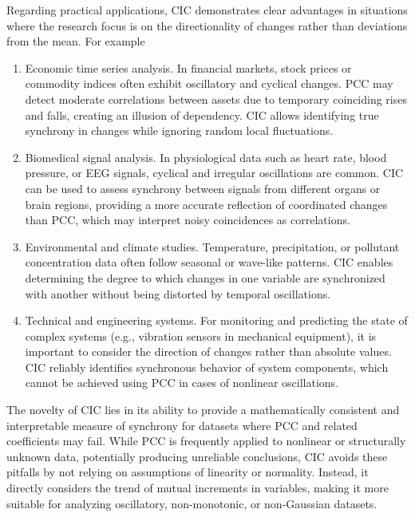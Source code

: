 \documentclass[aos]{imsart}
\newcommand{\cic}{\text{CIC}}
\newcommand{\pcc}{\text{PCC}}
\begin{document}
Regarding practical applications, $\cic$ demonstrates clear advantages in situations where the research focus is on the directionality of changes rather than deviations from the mean. For example
\begin{enumerate}
\item Economic time series analysis. In financial markets, stock prices or commodity indices often exhibit oscillatory and cyclical changes. $\pcc$ may detect moderate correlations between assets due to temporary coinciding rises and falls, creating an illusion of dependency. $\cic$ allows identifying true synchrony in changes while ignoring random local fluctuations.

\item Biomedical signal analysis. In physiological data such as heart rate, blood pressure, or EEG signals, cyclical and irregular oscillations are common. $\cic$ can be used to assess synchrony between signals from different organs or brain regions, providing a more accurate reflection of coordinated changes than $\pcc$, which may interpret noisy coincidences as correlations.

\item Environmental and climate studies. Temperature, precipitation, or pollutant concentration data often follow seasonal or wave-like patterns. $\cic$ enables determining the degree to which changes in one variable are synchronized with another without being distorted by temporal oscillations.

\item Technical and engineering systems. For monitoring and predicting the state of complex systems (e.g., vibration sensors in mechanical equipment), it is important to consider the direction of changes rather than absolute values. $\cic$ reliably identifies synchronous behavior of system components, which cannot be achieved using $\pcc$ in cases of nonlinear oscillations.
\end{enumerate}

The novelty of $\cic$ lies in its ability to provide a mathematically consistent and interpretable measure of synchrony for datasets where $\pcc$ and related coefficients may fail. While $\pcc$ is frequently applied to nonlinear or structurally unknown data, potentially producing unreliable conclusions, $\cic$ avoids these pitfalls by not relying on assumptions of linearity or normality. Instead, it directly considers the trend of mutual increments in variables, making it more suitable for analyzing oscillatory, non-monotonic, or non-Gaussian datasets.
\end{document}
